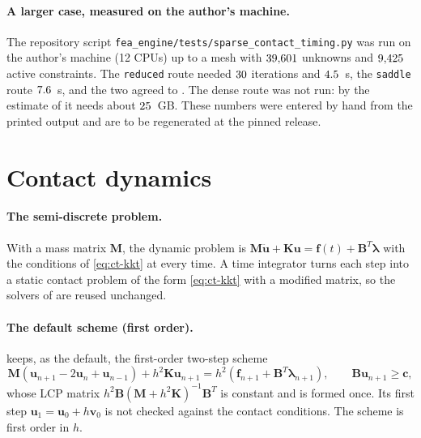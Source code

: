 \paragraph{A larger case, measured on the author's machine.}
The repository script \texttt{fea\_engine/tests/sparse\_contact\_timing.py} was run on the author's machine (12 CPUs) up to a mesh with $39{,}601$ unknowns and $9{,}425$ active constraints. The \texttt{reduced} route needed $30$ iterations and $4.5$~s, the \texttt{saddle} route $7.6$~s, and the two agreed to \ctcAuthDiff. The dense route was not run: by the estimate of  it needs about $25$~GB. These numbers were entered by hand from the printed output and are to be regenerated at the pinned release.

\section{Contact dynamics}\label{sec:ct-dyn}

\paragraph{The semi-discrete problem.}
With a mass matrix $\bm M$, the dynamic problem is $\bm M\ddot{\bm u}+\bm K\bm u=\bm f(t)+\bm B^T\bm\lambda$ with the conditions of \eqref{eq:ct-kkt} at every time. A time integrator turns each step into a static contact problem of the form \eqref{eq:ct-kkt} with a modified matrix, so the solvers of  are reused unchanged.

\paragraph{The default scheme (first order).}
\fea{} keeps, as the default, the first-order two-step scheme
\begin{equation}\label{eq:ct-twostep}
\bm M(\bm u_{n+1}-2\bm u_n+\bm u_{n-1})+h^2\bm K\bm u_{n+1}=h^2(\bm f_{n+1}+\bm B^T\bm\lambda_{n+1}),\qquad \bm B\bm u_{n+1}\ge\bm c ,
\end{equation}
whose LCP matrix $h^2\bm B(\bm M+h^2\bm K)^{-1}\bm B^T$ is constant and is formed once. Its first step $\bm u_1=\bm u_0+h\bm v_0$ is not checked against the contact conditions. The scheme is first order in $h$.


